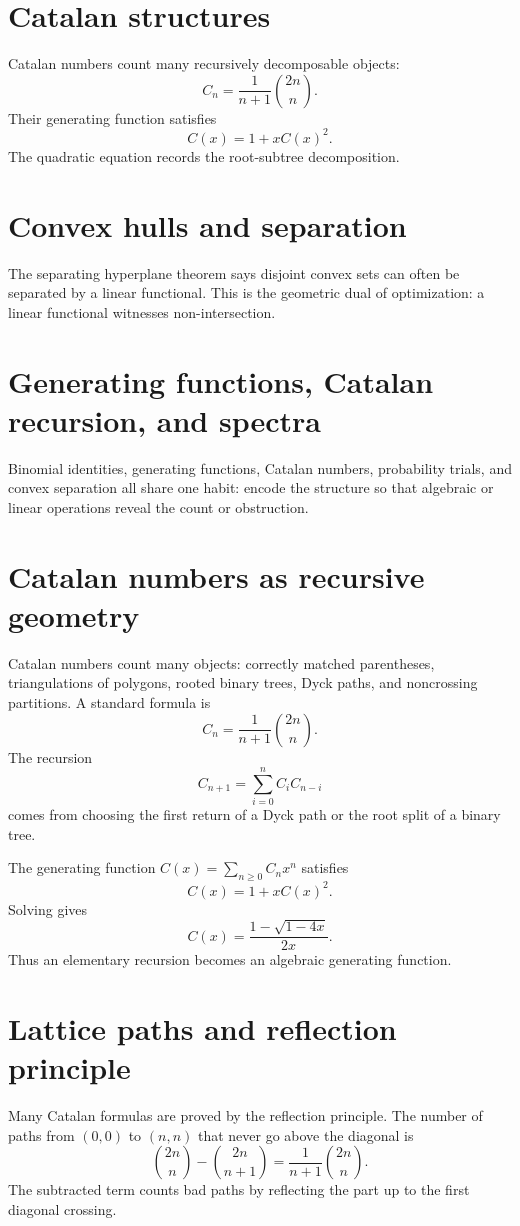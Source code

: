 \section{Catalan structures}
Catalan numbers count many recursively decomposable objects:
\[
C_n=\frac1{n+1}\binom{2n}{n}.
\]
Their generating function satisfies
\[
C(x)=1+xC(x)^2.
\]
The quadratic equation records the root-subtree decomposition.
\section{Convex hulls and separation}
The separating hyperplane theorem says disjoint convex sets can often be separated by a linear functional.  This is the geometric dual of optimization: a linear functional witnesses non-intersection.
\section{Generating functions, Catalan recursion, and spectra}
Binomial identities, generating functions, Catalan numbers, probability trials, and convex separation all share one habit: encode the structure so that algebraic or linear operations reveal the count or obstruction.

\section{Catalan numbers as recursive geometry}

Catalan numbers count many objects: correctly matched parentheses, triangulations of polygons, rooted binary trees, Dyck paths, and noncrossing partitions.  A standard formula is
\[
  C_n=\frac1{n+1}\binom{2n}{n}.
\]
The recursion
\[
  C_{n+1}=\sum_{i=0}^n C_iC_{n-i}
\]
comes from choosing the first return of a Dyck path or the root split of a binary tree.

The generating function $C(x)=\sum_{n\ge0}C_nx^n$ satisfies
\[
  C(x)=1+xC(x)^2.
\]
Solving gives
\[
  C(x)=\frac{1-\sqrt{1-4x}}{2x}.
\]
Thus an elementary recursion becomes an algebraic generating function.

\section{Lattice paths and reflection principle}

Many Catalan formulas are proved by the reflection principle.  The number of paths from $(0,0)$ to $(n,n)$ that never go above the diagonal is
\[
  \binom{2n}{n}-\binom{2n}{n+1}=\frac1{n+1}\binom{2n}{n}.
\]
The subtracted term counts bad paths by reflecting the part up to the first diagonal crossing.

